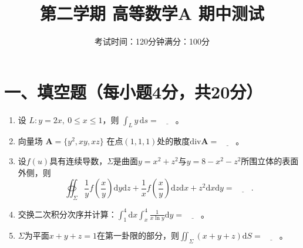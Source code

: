 \documentclass[12pt,a4paper]{ctexart}
\title{\textbf{第二学期 高等数学A 期中测试}}
\author{考试时间：120分钟\qquad 满分：100分}
\date{}
\begin{document}
\maketitle

\section*{一、填空题（每小题4分，共20分）}
\begin{enumerate}
\item 设 $L: y=2x,\ 0 \le x \le 1$，则 $\int_{L} y \,\mathrm{d}s=\underline{\quad\quad}$。
\item 向量场 $\boldsymbol{A}=\{y^{2}, xy, xz\}$ 在点$(1,1,1)$处的散度$\mathrm{div}\boldsymbol{A}=\underline{\quad\quad}$。
\item 设$f(u)$具有连续导数，$\Sigma$是曲面$y=x^{2}+z^{2}$与$y=8-x^{2}-z^{2}$所围立体的表面外侧，则
\[
\oiint_{\Sigma} \frac{1}{y} f\left(\frac{x}{y}\right) \mathrm{d}y\mathrm{d}z+\frac{1}{x} f\left(\frac{x}{y}\right) \mathrm{d}z\mathrm{d}x+z^{2}\mathrm{d}x\mathrm{d}y=\underline{\quad\quad}.
\]
\item 交换二次积分次序并计算：$\int_{1}^{4} \mathrm{d}x \int_{x}^{4} \frac{1}{x \ln y} \mathrm{d}y=\underline{\quad\quad}$。
\item $\Sigma$为平面$x+y+z=1$在第一卦限的部分，则$\iint_{\Sigma }(x+y+z) \mathrm{d}S=\underline{\quad\quad}$。
\end{enumerate}

\vspace{1cm}
\end{document}
